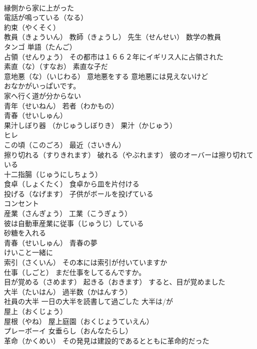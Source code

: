 \documentclass[8pt]{extreport}
\begin{document}
\begin{CJK}{UTF8}{min}
\\	縁側から家に上がった
\\	電話が鳴っている（なる）
\\	約束（やくそく） 
\\	教員（きょういん） 教師（きょうし） 先生（せんせい） 数学の教員
\\	タンゴ 単語（たんご）
\\	占領（せんりょう） その都市は１６６２年にイギリス人に占領された
\\	素直（な）（すなお） 素直な子だ
\\	意地悪（な）（いじわる） 意地悪をする 意地悪には見えないけど
\\	おなかがいっぱいです。
\\	家へ行く道が分からない
\\	青年（せいねん） 若者（わかもの）
\\	青春（せいしゅん）
\\	果汁しぼり器 （かじゅうしぼりき） 果汁（かじゅう）
\\	ヒレ
\\	この頃（このごろ） 最近（さいきん）
\\	擦り切れる（すりきれます） 破れる（やぶれます） 彼のオーバーは擦り切れている
\\	十二指腸（じゅうにしちょう）
\\	食卓（しょくたく） 食卓から皿を片付ける
\\	投げる（なげます） 子供がボールを投げている
\\	コンセント
\\	産業（さんぎょう） 工業（こうぎょう）
\\	彼は自動車産業に従事（じゅうじ）している
\\	砂糖を入れる
\\	青春（せいしゅん） 青春の夢
\\	けいこと一緒に
\\	索引（さくいん） その本には索引が付いていますか
\\	仕事（しごと） まだ仕事をしてるんですか。
\\	目が覚める（さめます） 起きる（おきます） すると、目が覚めました
\\	大半（たいはん） 過半数（かはんすう）
\\	社員の大半 一日の大半を読書して過ごした 大半は/が
\\	屋上（おくじょう） 
\\	屋根（やね） 屋上庭園（おくじょうていえん）
\\	プレーボーイ 女垂らし（おんなたらし）
\\	革命（かくめい） その発見は建設的であるとともに革命的だった

\end{CJK}
\end{document}
